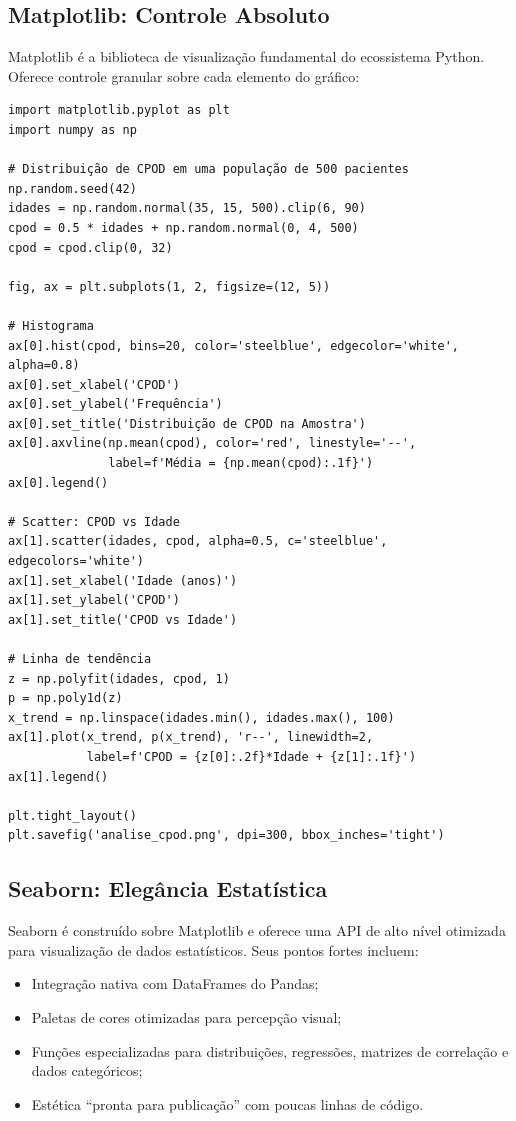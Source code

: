 \subsection{Matplotlib: Controle Absoluto}

Matplotlib  é a biblioteca de visualização fundamental do ecossistema Python. Oferece controle granular sobre cada elemento do gráfico:

\begin{verbatim}
import matplotlib.pyplot as plt
import numpy as np

# Distribuição de CPOD em uma população de 500 pacientes
np.random.seed(42)
idades = np.random.normal(35, 15, 500).clip(6, 90)
cpod = 0.5 * idades + np.random.normal(0, 4, 500)
cpod = cpod.clip(0, 32)

fig, ax = plt.subplots(1, 2, figsize=(12, 5))

# Histograma
ax[0].hist(cpod, bins=20, color='steelblue', edgecolor='white', alpha=0.8)
ax[0].set_xlabel('CPOD')
ax[0].set_ylabel('Frequência')
ax[0].set_title('Distribuição de CPOD na Amostra')
ax[0].axvline(np.mean(cpod), color='red', linestyle='--',
              label=f'Média = {np.mean(cpod):.1f}')
ax[0].legend()

# Scatter: CPOD vs Idade
ax[1].scatter(idades, cpod, alpha=0.5, c='steelblue', edgecolors='white')
ax[1].set_xlabel('Idade (anos)')
ax[1].set_ylabel('CPOD')
ax[1].set_title('CPOD vs Idade')

# Linha de tendência
z = np.polyfit(idades, cpod, 1)
p = np.poly1d(z)
x_trend = np.linspace(idades.min(), idades.max(), 100)
ax[1].plot(x_trend, p(x_trend), 'r--', linewidth=2,
           label=f'CPOD = {z[0]:.2f}*Idade + {z[1]:.1f}')
ax[1].legend()

plt.tight_layout()
plt.savefig('analise_cpod.png', dpi=300, bbox_inches='tight')
\end{verbatim}

\subsection{Seaborn: Elegância Estatística}

Seaborn  é construído sobre Matplotlib e oferece uma API de alto nível otimizada para visualização de dados estatísticos. Seus pontos fortes incluem:

\begin{itemize}
    \item Integração nativa com DataFrames do Pandas;
    \item Paletas de cores otimizadas para percepção visual;
    \item Funções especializadas para distribuições, regressões, matrizes de correlação e dados categóricos;
    \item Estética ``pronta para publicação'' com poucas linhas de código.
\end{itemize}

